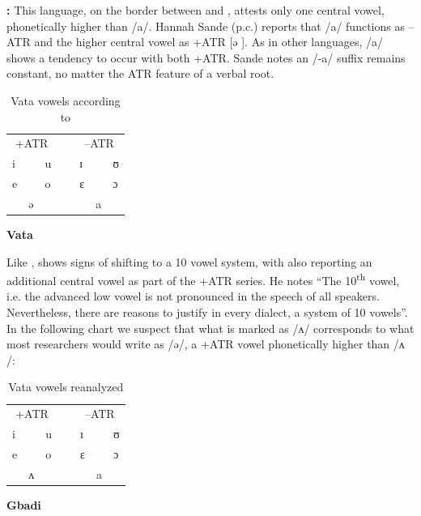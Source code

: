 \documentclass[output=paper
,newtxmath
,modfonts
,nonflat]{langsci/langscibook}
\begin{document}
\textbf{:} This language, on the border between  and , attests only one central vowel, phonetically higher than /a/. Hannah Sande (p.c.) reports that /a/ functions as –ATR and the higher central vowel as +ATR [ə{} ].  As in other  languages, /a/ shows a tendency to occur with both +ATR.  Sande notes an /-a/ suffix remains constant, no matter the ATR feature of a verbal root. 

\begin{table}
\caption{Vata vowels according to \citet{Kaye1980}}	
\label{tab:zogbo:14}
\begin{tabular}{lllllll}
\multicolumn{3}{c}{+ATR} && \multicolumn{3}{c}{–ATR}\\ 
i  &&  u  &~&  ɪ  &&  ʊ\\

e  &&  o  &&  ɛ  &&  ɔ\\

& ə   &&&&     a \\
	\end{tabular}
\end{table}

{\noindent\textbf{Vata} }

Like ,  shows signs of shifting to a 10 vowel system, with \citet[70]{Kaye1980} also reporting an additional central vowel as part of the +ATR series. He notes “The 10\textsuperscript{th} vowel, i.e. the advanced low vowel is not pronounced in the speech of all  speakers.  Nevertheless, there are reasons to justify in every  dialect, a system of 10 vowels”. In the following chart we suspect that what is marked as /ʌ/ corresponds to what most  researchers would write as /ə/, a  +ATR vowel phonetically higher than /ʌ /:


\begin{table}
\caption{Vata vowels reanalyzed}	
\label{tab:zogbo:15}
\begin{tabular}{lllllll}
\multicolumn{3}{c}{+ATR} && \multicolumn{3}{c}{–ATR}\\ 
i  &&  u  &~&  ɪ  &&  ʊ\\

e  &&  o  &&  ɛ  &&  ɔ\\

& ʌ   &&&&     a \\
	\end{tabular}
\end{table}

{\noindent\textbf{Gbadi} }
\end{document}
